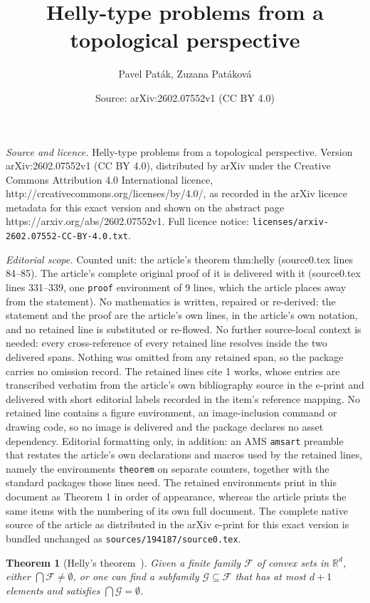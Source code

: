 \documentclass[10pt,a4paper]{amsart}
\title{Helly-type problems from a topological perspective}
\author{Pavel Pat\'ak, Zuzana Pat\'akov\'a}
\date{Source: arXiv:2602.07552v1 (CC BY 4.0)}
\newtheorem{theorem}{Theorem}
\newcommand{\R}{\mathbb{R}} 	%
\begin{document}
\maketitle

\noindent\emph{Source and licence.} Helly-type problems from a topological perspective. Version arXiv:2602.07552v1 (CC BY 4.0), distributed by arXiv under the Creative Commons Attribution 4.0 International licence, http://creativecommons.org/licenses/by/4.0/, as recorded in the arXiv licence metadata for this exact version and shown on the abstract page https://arxiv.org/abs/2602.07552v1. Full licence notice: \texttt{licenses/arxiv-2602.07552-CC-BY-4.0.txt}.\par\smallskip

\noindent\textit{Editorial scope.} Counted unit: the article's theorem thm:helly (source0.tex lines 84--85). The article's complete original proof of it is delivered with it (source0.tex lines 331--339, one \texttt{proof} environment of 9 lines, which the article places away from the statement). No mathematics is written, repaired or re-derived: the statement and the proof are the article's own lines, in the article's own notation, and no retained line is substituted or re-flowed.  No further source-local context is needed: every cross-reference of every retained line resolves inside the two delivered spans.  Nothing was omitted from any retained span, so the package carries no omission record.  The retained lines cite 1 works, whose entries are transcribed verbatim from the article's own bibliography source in the e-print and delivered with short editorial labels recorded in the item's reference mapping.  No retained line contains a figure environment, an image-inclusion command or drawing code, so no image is delivered and the package declares no asset dependency.  Editorial formatting only, in addition: an AMS \texttt{amsart} preamble that restates the article's own declarations and macros used by the retained lines, namely the environments \texttt{theorem} on separate counters, together with the standard packages those lines need.  The retained environments print in this document as Theorem 1 in order of appearance, whereas the article prints the same items with the numbering of its own full document.  The complete native source of the article as distributed in the arXiv e-print for this exact version is bundled unchanged as \texttt{sources/194187/source0.tex}.
\begin{theorem}[Helly's theorem~\cite{h-umkkm-23}]\label{thm:helly} Given a finite family $\mathcal F$ of convex sets in $\R^d$, either $\bigcap \mathcal F\neq \emptyset$, or one can find a subfamily $\mathcal G\subseteq \mathcal F$ that has at most $d+1$ elements and satisfies $\bigcap \mathcal G=\emptyset$.
\end{theorem}
\end{document}
